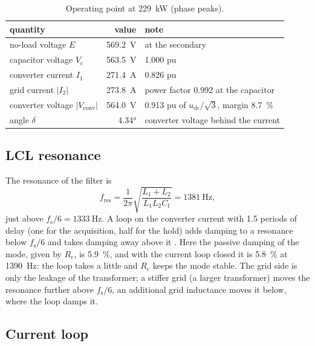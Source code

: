 \documentclass[11pt,a4paper]{scrartcl}
\newcommand{\ped}[1]{_{\mathrm{#1}}}
\begin{document}
\begin{onehalfspace}
\begin{table}[H]
	\centering
	\caption{Operating point at \SI{229}{\kilo\watt} (phase peaks).}
	\label{tab:op}
	\begin{tabular}{@{} l r l @{}}
		\toprule
		quantity & value & note \\
		\midrule
		no-load voltage $E$ & \SI{569.2}{\volt} & at the secondary \\
		capacitor voltage $V\ped{c}$ & \SI{563.5}{\volt} & \num{1.000} pu \\
		converter current $I_1$ & \SI{271.4}{\ampere} & \num{0.826} pu \\
		grid current $|I_2|$ & \SI{273.8}{\ampere} & power factor \num{0.992} at the capacitor \\
		converter voltage $|V\ped{conv}|$ & \SI{564.0}{\volt} & \num{0.913} pu of $u\ped{dc}/\sqrt3$, margin 8.7~\% \\
		angle $\delta$ & \ang{4.34} & converter voltage behind the current \\
		\bottomrule
	\end{tabular}
\end{table}

\subsection{LCL resonance}
\label{sec:lcl}

The resonance of the filter is
\begin{equation}
	f\ped{res} = \frac{1}{2\pi}\sqrt{\frac{L_1 + L_2}{L_1 L_2 C\ped{f}}} = \SI{1381}{\hertz},
\end{equation}
just above $f\ped{s}/6 = \SI{1333}{\hertz}$. A loop on the converter current with \num{1.5} periods of delay (one for the acquisition, half for the hold) adds damping to a resonance below $f\ped{s}/6$ and takes damping away above it \cite{dannehl2009, parker2014}. Here the passive damping of the mode, given by $R\ped{c}$, is 5.9~\%, and with the current loop closed it is 5.8~\% at \SI{1390}{\hertz}: the loop takes a little and $R\ped{c}$ keeps the mode stable. The grid side is only the leakage of the transformer; a stiffer grid (a larger transformer) moves the resonance further above $f\ped{s}/6$, an additional grid inductance moves it below, where the loop damps it.

\subsection{Current loop}
\label{sec:current}


\end{onehalfspace}
\end{document}
